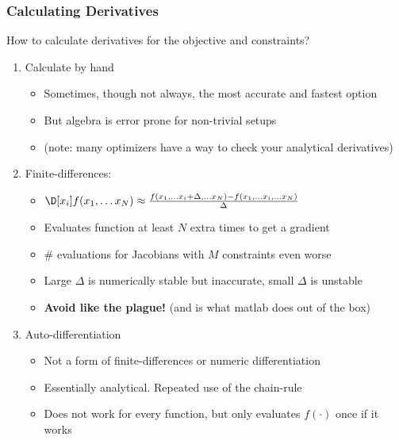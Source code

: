 \documentclass[nofootline]{etk-presentation}
\begin{document}
\begin{frame}[fragile]	\frametitle{Calculating Derivatives}
How to calculate derivatives for the objective and constraints?
\begin{enumerate}
	\item Calculate by hand
	\begin{itemize}
		\item Sometimes, though not always, the most accurate and fastest option
		\item But algebra is error prone for non-trivial setups
		\item (note: many optimizers have a way to check your analytical derivatives)
	\end{itemize}
\bigskip
	\item Finite-differences:
	\begin{itemize}
		\item $\D[x_i]f(x_1,\ldots x_N) \approx \frac{f(x_1,\ldots x_i + \Delta,\ldots x_N) - f(x_1,\ldots x_i,\ldots x_N)}{\Delta}$
		\item Evaluates function at least $N$ extra times to get a gradient
		\item \# evaluations for Jacobians with $M$ constraints even worse
		\item Large $\Delta$ is numerically stable but inaccurate, small $\Delta$ is unstable
		\item \textbf{Avoid like the plague!} (and is what matlab does out of the box)
	\end{itemize}
\bigskip
	\item Auto-differentiation
	\begin{itemize}
		\item Not a form of finite-differences or numeric differentiation
		\item Essentially analytical.  Repeated use of the chain-rule
		\item Does not work for every function, but only evaluates $f(\cdot)$ once if it works
	\end{itemize}
\end{enumerate}
\end{frame}
\end{document}
